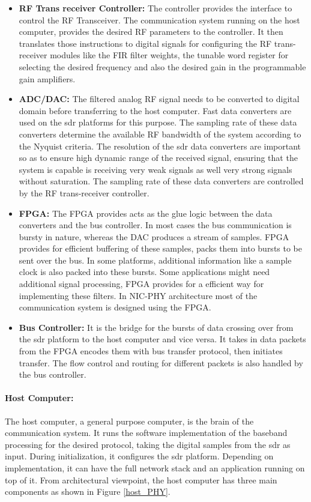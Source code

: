\begin{itemize}
\item{\textbf{\ac{RF} Trans receiver Controller:} The controller provides the interface to control the \ac{RF} Transceiver.
The communication system running on the host computer, provides the desired RF parameters to the controller.
It then translates those instructions to digital signals for configuring the RF trans-receiver modules like the \ac{FIR} filter weights, the tunable word register for selecting the desired frequency and also the desired gain in the programmable gain amplifiers.
}

\item{\textbf{ADC/DAC:} The filtered analog \ac{RF} signal needs to be converted to digital domain before transferring to the host computer.
Fast data converters are used on the \ac{sdr} platforms for this purpose.
The sampling rate of these data converters determine the available \ac{RF} bandwidth of the system according to the Nyquist criteria.
The resolution of the \ac{sdr} data converters are important so as to ensure high dynamic range of the received signal, ensuring that the system is capable is receiving very weak signals as well very strong signals without saturation.
The sampling rate of these data converters are controlled by the \ac{RF} trans-receiver controller.
}
\item{\textbf{\ac{FPGA}:} The \ac{FPGA} provides acts as the glue logic between the data converters and the bus controller.
In most cases the bus communication is bursty in nature, whereas the \ac{DAC} produces a stream of samples.
\ac{FPGA} provides for efficient buffering of these samples, packs them into bursts to be sent over the bus.
In some platforms, additional information like a sample clock is also packed into these bursts.
Some applications might need additional signal processing, \ac{FPGA} provides for a efficient way for implementing these filters.
In NIC-PHY architecture most of the communication system is designed using the \ac{FPGA}.
}
\item{\textbf{Bus Controller:} It is the bridge for the bursts of data crossing over from the \ac{sdr} platform to the host computer and vice versa.
It takes in data packets from the \ac{FPGA} encodes them with bus transfer protocol, then initiates transfer.
The flow control and routing for different packets is also handled by the bus controller.}
\end{itemize}

\paragraph{Host Computer:} The host computer, a general purpose computer, is the brain of the communication system.
It runs the software implementation of the baseband processing for the desired protocol, taking the digital samples from the \ac{sdr} as input.
During initialization, it configures the \ac{sdr} platform.
Depending on implementation, it can have the full network stack and an application running on top of it.
From architectural viewpoint, the host computer has three main components as shown in Figure \ref{host_PHY}.

